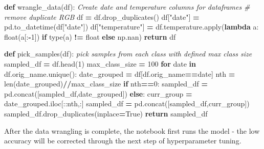 \documentclass[
]{article}
\newenvironment{Shaded}{\begin{snugshade}}{\end{snugshade}}
\newcommand{\BuiltInTok}[1]{#1}
\newcommand{\CommentTok}[1]{\textcolor[rgb]{0.56,0.35,0.01}{\textit{#1}}}
\newcommand{\ControlFlowTok}[1]{\textcolor[rgb]{0.13,0.29,0.53}{\textbf{#1}}}
\newcommand{\DecValTok}[1]{\textcolor[rgb]{0.00,0.00,0.81}{#1}}
\newcommand{\KeywordTok}[1]{\textcolor[rgb]{0.13,0.29,0.53}{\textbf{#1}}}
\newcommand{\NormalTok}[1]{#1}
\newcommand{\OperatorTok}[1]{\textcolor[rgb]{0.81,0.36,0.00}{\textbf{#1}}}
\newcommand{\StringTok}[1]{\textcolor[rgb]{0.31,0.60,0.02}{#1}}
\newcommand{\VariableTok}[1]{\textcolor[rgb]{0.00,0.00,0.00}{#1}}
\begin{document}
\begin{Shaded}
\begin{Highlighting}[]
\KeywordTok{def}\NormalTok{ wrangle\_data(df):}
    \CommentTok{\textquotesingle{}\textquotesingle{}\textquotesingle{}}
\CommentTok{    Create date and temperature columns for dataframes}
\CommentTok{    \textquotesingle{}\textquotesingle{}\textquotesingle{}}
    \CommentTok{\# remove duplicate RGB}
\NormalTok{    df }\OperatorTok{=}\NormalTok{ df.drop\_duplicates()}
\NormalTok{    df[}\StringTok{"date"}\NormalTok{] }\OperatorTok{=}\NormalTok{ pd.to\_datetime(df[}\StringTok{"date"}\NormalTok{])}
\NormalTok{    df[}\StringTok{"temperature"}\NormalTok{] }\OperatorTok{=}\NormalTok{ df.temperature.}\BuiltInTok{apply}\NormalTok{(}\KeywordTok{lambda}\NormalTok{ a: }\BuiltInTok{float}\NormalTok{(a[:}\OperatorTok{{-}}\DecValTok{1}\NormalTok{]) }\ControlFlowTok{if} \BuiltInTok{type}\NormalTok{(a) }\OperatorTok{!=} \BuiltInTok{float} \ControlFlowTok{else}\NormalTok{ np.nan)}
    \ControlFlowTok{return}\NormalTok{ df}

\KeywordTok{def}\NormalTok{ pick\_samples(df):}
    \CommentTok{\textquotesingle{}\textquotesingle{}\textquotesingle{}}
\CommentTok{    pick samples from each class with defined max class size}
\CommentTok{    \textquotesingle{}\textquotesingle{}\textquotesingle{}}
\NormalTok{    sampled\_df }\OperatorTok{=}\NormalTok{ df.head(}\DecValTok{1}\NormalTok{)}
\NormalTok{    max\_class\_size }\OperatorTok{=} \DecValTok{100}
    \ControlFlowTok{for}\NormalTok{ date }\KeywordTok{in}\NormalTok{ df.orig\_name.unique():}
\NormalTok{        date\_grouped }\OperatorTok{=}\NormalTok{ df[df.orig\_name}\OperatorTok{==}\NormalTok{date]}
\NormalTok{        nth }\OperatorTok{=} \BuiltInTok{len}\NormalTok{(date\_grouped)}\OperatorTok{//}\NormalTok{max\_class\_size}
        \ControlFlowTok{if}\NormalTok{ nth}\OperatorTok{==}\DecValTok{0}\NormalTok{:}
\NormalTok{            sampled\_df }\OperatorTok{=}\NormalTok{ pd.concat([sampled\_df,date\_grouped])}
        \ControlFlowTok{else}\NormalTok{:}
\NormalTok{            curr\_group }\OperatorTok{=}\NormalTok{ date\_grouped.iloc[::nth,:]}
\NormalTok{            sampled\_df }\OperatorTok{=}\NormalTok{ pd.concat([sampled\_df,curr\_group])}
\NormalTok{    sampled\_df.drop\_duplicates(inplace}\OperatorTok{=}\VariableTok{True}\NormalTok{)}
    \ControlFlowTok{return}\NormalTok{ sampled\_df}
\end{Highlighting}
\end{Shaded}

After the data wrangling is complete, the notebook first runs the model - the low accuracy will be corrected through the next step of hyperparameter tuning.
\end{document}

